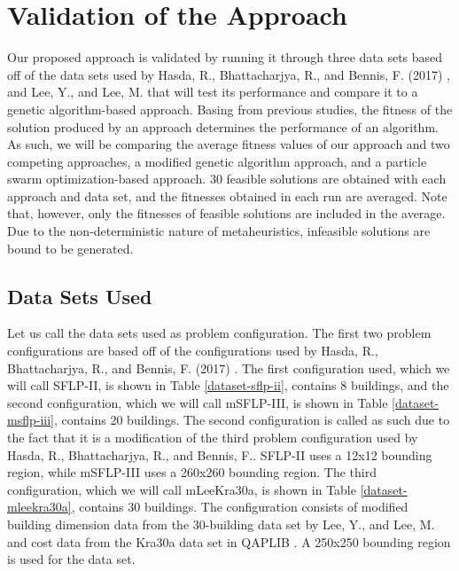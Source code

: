 \chapter{Validation of the Approach}
Our proposed approach is validated by running it through three data sets based off of the data sets used by Hasda, R., Bhattacharjya, R., and Bennis, F. (2017) \cite{Hasda2017}, and Lee, Y., and Lee, M. \cite{Lee2002} that will test its performance and compare it to a genetic algorithm-based approach. Basing from previous studies, the fitness of the solution produced by an approach determines the performance of an algorithm. As such, we will be comparing the average fitness values of our approach and two competing approaches, a modified genetic algorithm approach, and a particle swarm optimization-based approach. 30 feasible solutions are obtained with each approach and data set, and the fitnesses obtained in each run are averaged. Note that, however, only the fitnesses of feasible solutions are included in the average. Due to the non-deterministic nature of metaheuristics, infeasible solutions are bound to be generated.

\section{Data Sets Used}
Let us call the data sets used as problem configuration. The first two problem configurations are based off of the configurations used by Hasda, R., Bhattacharjya, R., and Bennis, F. (2017) \cite{Hasda2017}. The first configuration used, which we will call SFLP-II, is shown in Table \ref{dataset-sflp-ii}, contains 8 buildings, and the second configuration, which we will call mSFLP-III, is shown in Table \ref{dataset-msflp-iii}, contains 20 buildings. The second configuration is called as such due to the fact that it is a modification of the third problem configuration used by Hasda, R., Bhattacharjya, R., and Bennis, F.. SFLP-II uses a 12x12 bounding region, while mSFLP-III uses a 260x260 bounding region. The third configuration, which we will call mLeeKra30a, is shown in Table \ref{dataset-mleekra30a}, contains 30 buildings. The configuration consists of modified building dimension data from the 30-building data set by Lee, Y., and Lee, M. \cite{Lee2002} and cost data from the Kra30a data set in QAPLIB \cite{QAPLib}. A 250x250 bounding region is used for the data set.

